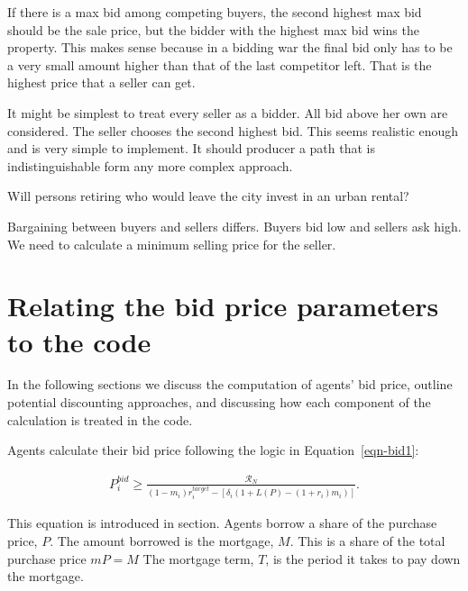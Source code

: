 If there is a  max bid among competing buyers, the second highest max bid should be the sale price, but the bidder with the highest max bid wins the property. This makes sense because in a bidding war the final bid only has to be a very small amount higher than that of the last competitor left.
That is the highest price that a seller can get.

It might be simplest to treat every seller as a bidder. All bid above her own are considered. The seller chooses the second highest bid. This  seems realistic enough and is very simple to implement. It should producer a path that is indistinguishable form any more complex approach. 

Will persons retiring who would leave the city invest in an urban rental?

Bargaining between buyers and sellers differs. Buyers bid low and sellers ask high. {\color{red}We need to calculate a minimum selling price for the seller}.



\section{Relating the bid price parameters to the code}

In the following sections we discuss the computation of agents' bid price, outline potential discounting approaches, and discussing how each component of the calculation is treated in the code. 

Agents calculate their bid price following the logic in Equation~\ref{eqn-bid1}: 
 
\begin{align*}
P_i^{bid} \ge   \frac{ \mathcal{R}_N}{(1-m_i)r_i^{target}-\left[ \delta_i(1+L(P)- (1+ r_i)m_i)\right]}. 
\end{align*}

This equation is introduced in section. 
Agents borrow a share of the purchase price, $P$. The amount borrowed is the mortgage, $M$. This is a share of the total purchase price $mP = M$
The \gls{mortgage term}, $T$, is the period it takes to pay down the mortgage.

